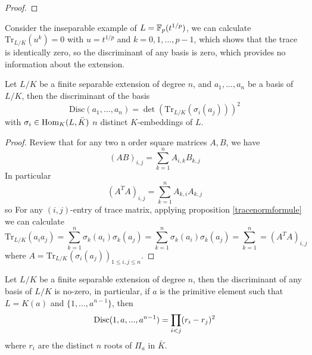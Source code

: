 \begin{proof}
  
\end{proof}

\begin{remark}
  Consider the inseparable example of \(L = \mathbb{F}_p(t^{1/p})\), we can calculate  \(\mathrm{Tr}_{L/K}(u^k) = 0\) with \(u = t^{1/p}\) and \(k = 0,1,...,p-1\), which shows that the trace is identically zero, so the discriminant of any basis is zero, which provides no information about the extension.
\end{remark}

\begin{colorproposition}
  Let \(L/K\) be a finite separable extension of degree \(n\), and \(a_1,...,a_n\) be a basis of \(L/K\), then the discriminant of the basis 
  \[\mathrm{Disc}(a_1,...,a_n) = \det(\mathrm{Tr}_{L/K}(\sigma_i(a_j)))^2\]
  with \(\sigma_i \in \operatorname{Hom}_K(L,\bar{K})\) \(n\) distinct \(K\)-embeddings of \(L\). 
\end{colorproposition}

\begin{proof}
  Review that for any two n order square matrices \(A,B\), we have
  \[(AB)_{i,j} = \sum_{k=1}^n A_{i,k} B_{k,j}\]
  In particular
  \[(A^TA)_{i,j} = \sum_{k=1}^n A_{k,i}A_{k,j}\]
  so For any \((i,j)\)-entry of trace matrix, applying proposition \ref{tracenormformule} we can calculate
  \[\mathrm{Tr}_{L/K}(a_ia_j) = \sum_{k=1}^n \sigma_k(a_i)\sigma_k(a_j) = 
  \sum_{k=1}^n \sigma_k(a_i)\sigma_k(a_j) = \sum_{k=1}^n = (A^TA)_{i,j}\]
  where \(A = \mathrm{Tr}_{L/K}(\sigma_i(a_j))_{1 \leq i,j \leq n}\).
\end{proof}

\begin{colorcorollary}
  Let \(L/K\) be a finite separable extension of degree \(n\), then the discriminant of any basis of \(L/K\) is no-zero, in particular, if \(a\) is the primitive element such that \(L=K(a)\) and \(\{1,...,a^{n-1}\}\), then
  \[\operatorname{Disc}(1,a,...,a^{n-1}) = \prod_{i<j}(r_i-r_j)^2\]
  where \(r_i\) are the distinct \(n\) roots of \(\Pi_a\) in \(\bar{K}\).
\end{colorcorollary}

